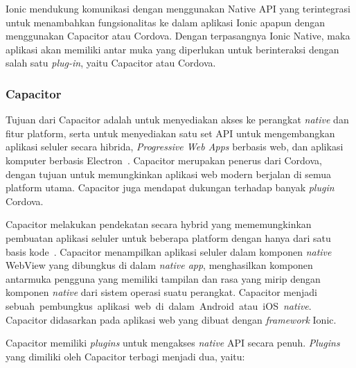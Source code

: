 \newpage

Ionic mendukung komunikasi dengan menggunakan Native API yang terintegrasi untuk menambahkan fungsionalitas ke dalam aplikasi Ionic apapun dengan menggunakan Capacitor atau Cordova. Dengan terpasangnya Ionic Native, maka aplikasi akan memiliki antar muka yang diperlukan untuk berinteraksi dengan salah satu {\it plug-in}, yaitu Capacitor atau Cordova.

\subsubsection{Capacitor}
\label{subsec:capacitor}
Tujuan dari Capacitor adalah untuk menyediakan akses ke perangkat {\it native} dan fitur platform, serta untuk menyediakan satu set API untuk mengembangkan aplikasi seluler secara hibrida, {\it Progressive Web Apps} berbasis web, dan aplikasi komputer berbasis Electron~\cite{tor:19:software}. Capacitor merupakan penerus dari Cordova, dengan tujuan untuk memungkinkan aplikasi web modern berjalan di semua platform utama. Capacitor juga mendapat dukungan terhadap banyak {\it plugin} Cordova.

Capacitor melakukan pendekatan secara hybrid yang mememungkinkan pembuatan aplikasi seluler untuk beberapa platform dengan hanya dari satu basis kode~\cite{huber:21:pwa}. Capacitor menampilkan aplikasi seluler dalam komponen \textit{native} WebView yang dibungkus di dalam \textit{native app}, menghasilkan komponen antarmuka pengguna yang memiliki tampilan dan rasa yang mirip dengan komponen \textit{native} dari sistem operasi suatu perangkat. Capacitor menjadi sebuah~pembungkus~aplikasi~web~di~dalam~Android~atau~iOS~\textit{native}. Capacitor didasarkan pada aplikasi web yang dibuat dengan \textit{framework} Ionic.

Capacitor memiliki \textit{plugins} untuk mengakses \textit{native} API secara penuh. \textit{Plugins} yang dimiliki oleh Capacitor terbagi menjadi dua, yaitu:

